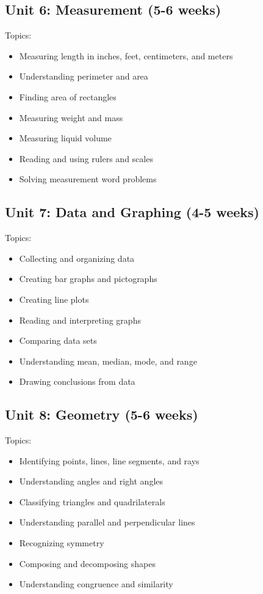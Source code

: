 \documentclass[11pt,letterpaper]{report}
\begin{document}
\subsection{Unit 6: Measurement (5-6 weeks)}

Topics:
\begin{itemize}
\item Measuring length in inches, feet, centimeters, and meters
\item Understanding perimeter and area
\item Finding area of rectangles
\item Measuring weight and mass
\item Measuring liquid volume
\item Reading and using rulers and scales
\item Solving measurement word problems
\end{itemize}

\subsection{Unit 7: Data and Graphing (4-5 weeks)}

Topics:
\begin{itemize}
\item Collecting and organizing data
\item Creating bar graphs and pictographs
\item Creating line plots
\item Reading and interpreting graphs
\item Comparing data sets
\item Understanding mean, median, mode, and range
\item Drawing conclusions from data
\end{itemize}

\subsection{Unit 8: Geometry (5-6 weeks)}

Topics:
\begin{itemize}
\item Identifying points, lines, line segments, and rays
\item Understanding angles and right angles
\item Classifying triangles and quadrilaterals
\item Understanding parallel and perpendicular lines
\item Recognizing symmetry
\item Composing and decomposing shapes
\item Understanding congruence and similarity
\end{itemize}
\end{document}
